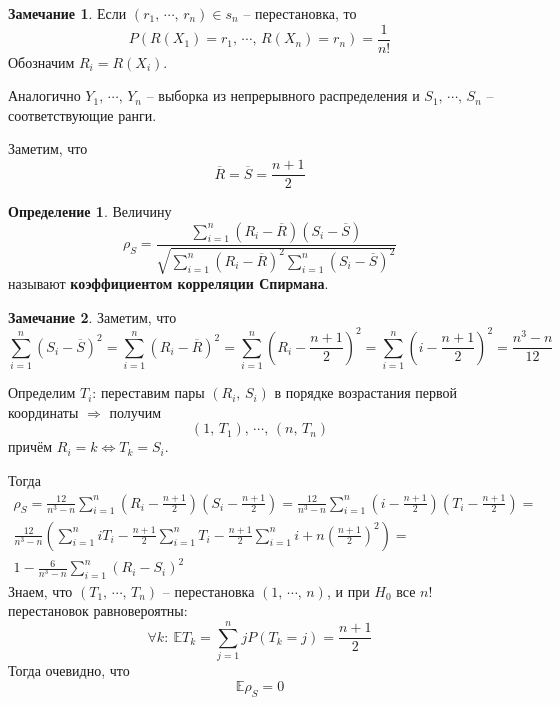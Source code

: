 \documentclass[a4paper,12pt]{article}
\theoremstyle{plain}
\theoremstyle{definition}
\newtheorem{definition}{Определение}[section]
\newtheorem*{note}{Замечание}
\theoremstyle{remark}
\begin{document}
\begin{note}
  Если $(r_1,\,\cdots,\,r_n) \in s_n$ -- перестановка, то
  \[
    P(R(X_1) = r_1,\,\cdots,\,R(X_n) = r_n) = \frac{1}{n!}
  \]
  Обозначим $R_i = R(X_i)$. 

  Аналогично $Y_1,\,\cdots,\,Y_n$ -- выборка из непрерывного распределения и $S_1,\,\cdots,\,S_n$ -- соответствующие ранги.

  Заметим, что
  \[
    \overline{R} = \overline{S} = \frac{n + 1}{2}
  \]
\end{note}

\begin{definition}
  Величину 
  \[
    \rho_S = \frac{\sum_{i = 1}^n(R_i - \overline{R})(S_i - \overline{S})}{\sqrt{\sum_{i = 1}^n(R_i - \overline{R})^2\sum_{i = 1}^n(S_i - \overline{S})^2}}
  \]
  называют \textbf{коэффициентом корреляции Спирмана}.
\end{definition}

\begin{note}
  Заметим, что
  \[
    \sum_{i = 1}^n(S_i - \overline{S})^2 = \sum_{i = 1}^n(R_i - \overline{R})^2 = \sum_{i = 1}^n\left(R_i - \frac{n + 1}{2}\right)^2 = \sum_{i = 1}^n\left(i - \frac{n + 1}{2}\right)^2 = \frac{n^3 - n}{12}
  \]
\end{note}

Определим $T_i$: переставим пары $(R_i,\,S_i)$ в порядке возрастания первой координаты $\Rightarrow$ получим
\[
  (1,\,T_1),\,\cdots,\,(n,\,T_n)
\]
причём $R_i = k \Leftrightarrow T_k = S_i$.

Тогда
\begin{align*}
  \rho_S = \frac{12}{n^3 - n}\sum_{i = 1}^n(R_i - \frac{n + 1}{2})(S_i - \frac{n + 1}{2}) = \frac{12}{n^3 - n}\sum_{i = 1}^n(i - \frac{n + 1}{2})(T_i - \frac{n + 1}{2}) =\\
  \frac{12}{n^3 - n}(\sum_{i = 1}^n iT_i - \frac{n + 1}{2}\sum_{i = 1}^nT_i - \frac{n + 1}{2}\sum_{i = 1}^ni + n(\frac{n + 1}{2})^2) =\\
  1 - \frac{6}{n^3 - n}\sum_{i = 1}^n(R_i - S_i)^2
\end{align*}
Знаем, что $(T_1,\,\cdots,\,T_n)$ -- перестановка $(1,\,\cdots,\,n)$, и при $H_0$ все $n!$ перестановок равновероятны:
\[
  \forall k :\: \mathbb{E}T_k = \sum_{j = 1}^n jP(T_k = j) = \frac{n + 1}{2}
\]
Тогда очевидно, что
\[
  \mathbb{E}\rho_S = 0
\]
\end{document}
